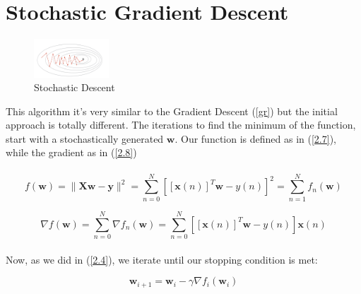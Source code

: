 \documentclass[12pt]{report}
\begin{document}
\section{Stochastic Gradient Descent}
\begin{figure}
  \vspace{-35pt}
  \begin{center}
    \includegraphics[width=0.25\textwidth]{stch.png}
    \caption{Stochastic Descent}
    \label{fig:stch}
  \end{center}
\end{figure}
This algorithm it's very similar to the Gradient Descent (\ref{gr}) but the initial approach is totally different. The iterations to find the minimum of the function, start with a stochastically generated $\textbf{w}$.
Our function is defined as in (\ref{2.7}), while the gradient as in (\ref{2.8})
\\\\
\begin{equation}\label{2.7}
f ( \mathbf { w } ) = \| \mathbf { X } \mathbf { w } - \mathbf { y } \| ^ { 2 } = \sum _ { n = 0 } ^ { N }  [ [ \mathbf { x } ( n ) ] ^ { T } \mathbf { w } - y ( n ) ] ^ { 2 } = \sum _ { n = 1 } ^ { N } f _ { n } ( \mathbf { w } )
\end{equation}

\begin{equation}\label{2.8}
\nabla f ( \mathbf { w } ) = \sum _ { n = 0 } ^ { N } \nabla f _ { n } ( \mathbf { w } ) = \sum _ { n = 0 } ^ { N } [ [ \mathbf { x } ( n ) ] ^ { T } \mathbf { w } - y ( n ) ] \mathbf { x } ( n )
\end{equation}\\

Now, as we did in (\ref{2.4}), we iterate until our stopping condition is met:

\begin{equation}\label{2.9}
\mathbf { w } _ { i + 1 } = \mathbf { w } _ { i } - \gamma \nabla f _ { i } ( \mathbf { w } _ { i } )
\end{equation}
\end{document}
